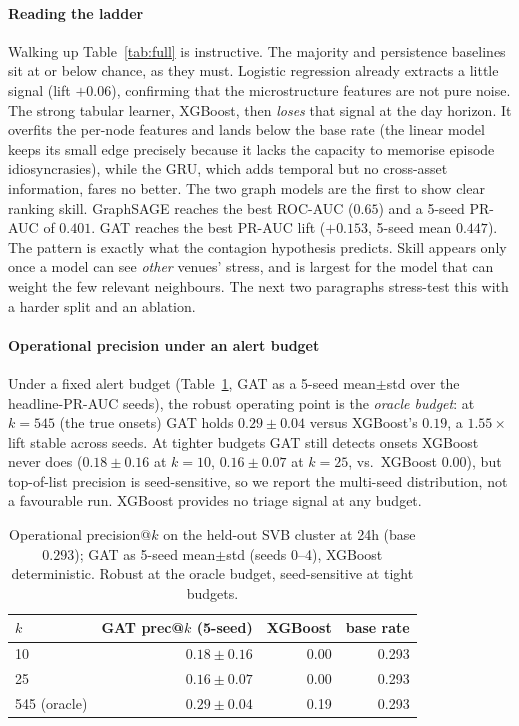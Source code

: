 \documentclass[sigconf,anonymous]{acmart}
\begin{document}
\paragraph{Reading the ladder} Walking up Table~\ref{tab:full} is instructive. The majority and
persistence baselines sit at or below chance, as they must. Logistic regression already extracts a
little signal (lift $+0.06$), confirming that the microstructure features are not pure noise. The
strong tabular learner, XGBoost, then \emph{loses} that signal at the day horizon. It overfits the
per-node features and lands below the base rate (the linear model keeps its small edge precisely
because it lacks the capacity to memorise episode idiosyncrasies), while the GRU, which adds
temporal but no cross-asset information, fares no better. The two graph models are the first to show clear ranking skill. GraphSAGE reaches the best
ROC-AUC ($0.65$) and a 5-seed PR-AUC of $0.401$. GAT reaches the best PR-AUC lift ($+0.153$,
5-seed mean $0.447$). The pattern is exactly what the contagion hypothesis predicts. Skill appears
only once a model can see \emph{other} venues' stress, and is largest for the model that can weight
the few relevant neighbours. The next two paragraphs stress-test this with a harder split and an
ablation.

\paragraph{Operational precision under an alert budget}
Under a fixed alert budget (Table~\ref{tab:preck}, GAT as a 5-seed mean$\pm$std over the headline-PR-AUC
seeds), the robust operating point is the \emph{oracle budget}: at $k{=}545$ (the true onsets) GAT holds
$0.29\pm0.04$ versus XGBoost's $0.19$, a $1.55\times$ lift stable across seeds. At tighter budgets GAT
still detects onsets XGBoost never does ($0.18\pm0.16$ at $k{=}10$, $0.16\pm0.07$ at $k{=}25$, vs.\
XGBoost $0.00$), but top-of-list precision is seed-sensitive, so we report the multi-seed distribution,
not a favourable run. XGBoost provides no triage signal at any budget.

\begin{table}[t]
\caption{Operational precision@$k$ on the held-out SVB cluster at 24h (base $0.293$); GAT as
5-seed mean$\pm$std (seeds 0--4), XGBoost deterministic. Robust at the oracle budget, seed-sensitive
at tight budgets.}
\label{tab:preck}
\small
\setlength{\tabcolsep}{6pt}
\begin{tabular}{lrrr}
\toprule
$k$ & GAT prec@$k$ (5-seed) & XGBoost & base rate \\
\midrule
10 & $0.18\pm0.16$ & 0.00 & 0.293 \\
25 & $0.16\pm0.07$ & 0.00 & 0.293 \\
545 (oracle) & $\mathbf{0.29\pm0.04}$ & 0.19 & 0.293 \\
\bottomrule
\end{tabular}
\end{table}
\end{document}

